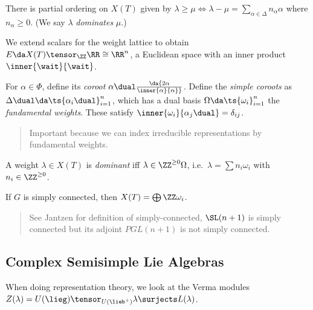 \begin{remark}

There is partial ordering on \(X(T)\) given by
\(\lambda \geq \mu \iff \lambda - \mu = \sum_{\alpha\in \Delta} n_\alpha \alpha\)
where \(n_\alpha \geq 0\). (We say \(\lambda\) \emph{dominates}
\(\mu\).)

\end{remark}

\begin{definition}

We extend scalars for the weight lattice to obtain
\(E \da X(T) \tensor_\ZZ \RR \cong \RR^n\), a Euclidean space with an
inner product \(\inner{\wait}{\wait}\).

For \(\alpha\in \Phi\), define its \emph{coroot}
\(\alpha\dual \da {2\alpha \over \inner{\alpha}{\alpha}}\). Define the
\emph{simple coroots} as \(\Delta\dual \da \ts{\alpha_i\dual}_{i=1}^n\),
which has a dual basis \(\Omega \da \ts{\omega_i}_{i=1}^n\) the
\emph{fundamental weights}. These satisfy
\(\inner{\omega_i}{\alpha_j\dual} = \delta_{ij}\).


\begin{quote}
Important because we can index irreducible representations by
fundamental weights.
\end{quote}

A weight \(\lambda\in X(T)\) is \emph{dominant} iff
\(\lambda \in \ZZ^{\geq 0} \Omega\),
i.e.~\(\lambda = \sum n_i \omega_i\) with \(n_i \in \ZZ^{\geq 0}\).

\end{definition}

If \(G\) is simply connected, then \(X(T) = \bigoplus \ZZ \omega_i\).

\begin{quote}
See Jantzen for definition of simply-connected, \(\SL(n+1)\) is simply
connected but its adjoint \(PGL(n+1)\) is not simply connected.
\end{quote}

\hypertarget{complex-semisimple-lie-algebras}{%
\subsection{Complex Semisimple Lie
Algebras}\label{complex-semisimple-lie-algebras}}

When doing representation theory, we look at the Verma modules
\(Z(\lambda) = U(\lieg) \tensor_{U(\lieb^+)} \lambda \surjects L(\lambda)\).

